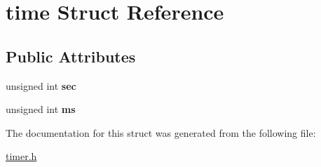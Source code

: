 \hypertarget{structtime}{}\section{time Struct Reference}
\label{structtime}
\subsection*{Public Attributes}
\begin{DoxyCompactItemize}
\item 
\mbox{\label{structtime_a905d04359080b9b6d74a5177509d597b}} 
unsigned int {\bfseries sec}
\item 
\mbox{\label{structtime_af111c6f72dfda20fe03bcd7b75348ff6}} 
unsigned int {\bfseries ms}
\end{DoxyCompactItemize}


The documentation for this struct was generated from the following file\+:\begin{DoxyCompactItemize}
\item 
\hyperlink{timer_8h}{timer.\+h}\end{DoxyCompactItemize}
